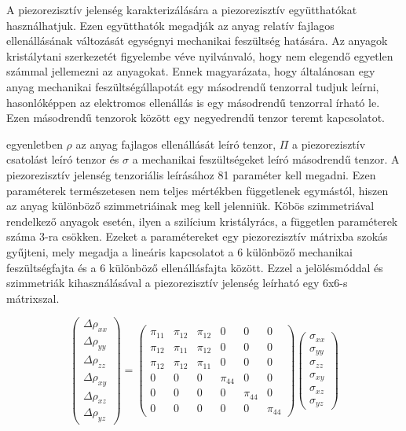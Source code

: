 A piezorezisztív jelenség karakterizálására a piezorezisztív együtthatókat használhatjuk. Ezen együtthatók megadják az anyag relatív fajlagos ellenállásának változását egységnyi mechanikai feszültség hatására. Az anyagok kristálytani szerkezetét figyelembe véve nyilvánvaló, hogy nem elegendő egyetlen számmal jellemezni az anyagokat. Ennek magyarázata, hogy általánosan egy anyag mechanikai feszültségállapotát egy másodrendű tenzorral tudjuk leírni, hasonlóképpen az elektromos ellenállás is egy másodrendű tenzorral írható le. Ezen másodrendű tenzorok között egy negyedrendű tenzor teremt kapcsolatot.


 egyenletben $\rho$ az anyag fajlagos ellenállását leíró tenzor, $\Pi$ a piezorezisztív csatolást leíró tenzor és $\sigma$ a mechanikai feszültségeket leíró másodrendű tenzor. A piezorezisztív jelenség tenzoriális leírásához 81 paraméter kell megadni. Ezen paraméterek természetesen nem teljes mértékben függetlenek egymástól, hiszen az anyag különböző szimmetriáinak meg kell jelenniük. Köbös szimmetriával rendelkező anyagok esetén, ilyen a szilícium kristályrács, a független paraméterek száma 3-ra csökken. Ezeket a paramétereket egy piezorezisztív mátrixba szokás gyűjteni, mely megadja a lineáris kapcsolatot a 6 különböző mechanikai feszültségfajta és a 6 különböző ellenállásfajta között. Ezzel a jelölésmóddal és szimmetriák kihasználásával a piezorezisztív jelenség leírható egy 6x6-s mátrixszal.

\begin{equation}
    \begin{pmatrix}
        \Delta\rho_{xx} \\
        \Delta\rho_{yy} \\
        \Delta\rho_{zz} \\
        \Delta\rho_{xy} \\
        \Delta\rho_{xz} \\
        \Delta\rho_{yz}
    \end{pmatrix}
    =
    \begin{pmatrix}
        \pi_{11} & \pi_{12} & \pi_{12} & 0 & 0 & 0 \\
        \pi_{12} & \pi_{11} & \pi_{12} & 0 & 0 & 0 \\
        \pi_{12} & \pi_{12} & \pi_{11} & 0 & 0 & 0 \\
        0 & 0 & 0 & \pi_{44} & 0 & 0 \\
        0 & 0 & 0 & 0 & \pi_{44} & 0 \\
        0 & 0 & 0 & 0 & 0 & \pi_{44}
    \end{pmatrix}
    \begin{pmatrix}
        \sigma_{xx} \\
        \sigma_{yy} \\
        \sigma_{zz} \\
        \sigma_{xy} \\
        \sigma_{xz} \\
        \sigma_{yz}
    \end{pmatrix}
\end{equation}

